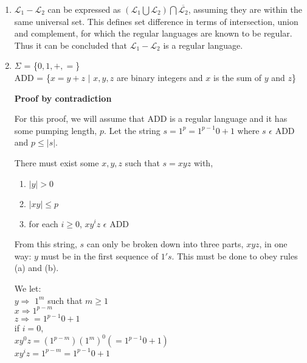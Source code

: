 \documentclass[a4paper, 12pt]{article}
\begin{document}
\begin{enumerate}
\begin{figure}[H]
\end{figure}

\item %
$\mathscr{L}_{1} - \mathscr{L}_{2}$ can be expressed as $(\mathscr{L}_{1} \bigcup \mathscr{L}_2) \bigcap \overline{\mathscr{L}_{2}}$, assuming they are within the same universal set. This defines set difference in terms of intersection, union and complement, for which the regular languages are known to be regular. Thus it can be concluded that $\mathscr{L}_{1}  - \mathscr{L}_{2}$ is a regular language.  




\item %
$\Sigma$ = \{$0, 1, +, =$\}\\
ADD = \{$x = y + z$ $\mid$ $x,y,z$ are binary integers and $x$ is the sum of $y$ and $z$\}

\textbf{Proof by contradiction}

For this proof, we will assume that ADD is a regular language and it has some pumping length, $p$. Let the string $s = 1^p =1^{p-1} 0 + 1$ where $s$ $\epsilon$ ADD and $p \leq |s|$. 

There must exist some $x,y,z$ such that $s = xyz$ with,
\begin{enumerate}
\item $|y| > 0$
\item $|xy| \leq p$
\item for each $i \geq 0$, $xy^iz$ $\epsilon$ ADD
\end{enumerate}

From this string, $s$ can only be broken down into three parts, $xyz$, in one way: $y$ must be in the first sequence of $1's$. This must be done to obey rules (a) and (b). 

We let:\\
$y \Rightarrow $ $1^m$ such that $m \geq 1$ \\
$x \Rightarrow 1^{p-m}$\\
$z \Rightarrow  =1^{p-1} 0 + 1$\\

if $i = 0$,\\
$xy^0z = (1^{p-m}) (1^m)^0 (=1^{p-1} 0 + 1)$\\
$xy^iz = 1^{p-m} = 1^{p-1} 0 + 1$\\


\end{enumerate}
\end{document}
